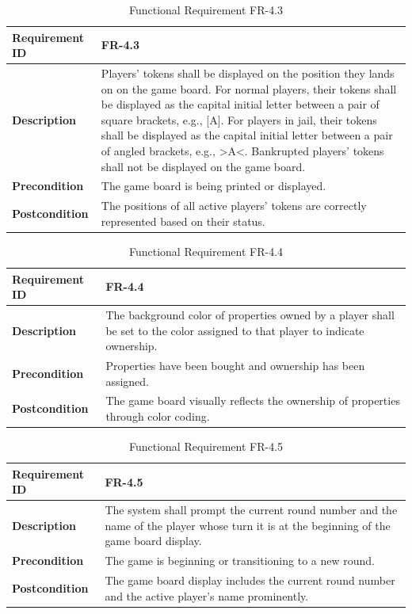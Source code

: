 \documentclass{article}
\begin{document}
\begin{table}[ht]
    \centering
    \caption{Functional Requirement FR-4.3}
    \begin{tabular}{@{}P{3cm}P{12cm}@{}}
        \toprule
        \textbf{Requirement ID} & FR-4.3 \\ \midrule
        \textbf{Description} & Players' tokens shall be displayed on the position they lands on on the game board. For normal players, their tokens shall be displayed as the capital initial letter between a pair of square brackets, e.g., [A]. For players in jail, their tokens shall be displayed as the capital initial letter between a pair of angled brackets, e.g., >A<. Bankrupted players’ tokens shall not be displayed on the game board. \\ \midrule
        \textbf{Precondition} & The game board is being printed or displayed. \\ \midrule
        \textbf{Postcondition} & The positions of all active players' tokens are correctly represented based on their status. \\ \bottomrule
    \end{tabular}
\end{table}

\begin{table}[ht]
    \centering
    \caption{Functional Requirement FR-4.4}
    \begin{tabular}{@{}P{3cm}P{12cm}@{}}
        \toprule
        \textbf{Requirement ID} & FR-4.4 \\ \midrule
        \textbf{Description} & The background color of properties owned by a player shall be set to the color assigned to that player to indicate ownership. \\ \midrule
        \textbf{Precondition} & Properties have been bought and ownership has been assigned. \\ \midrule
        \textbf{Postcondition} & The game board visually reflects the ownership of properties through color coding. \\ \bottomrule
    \end{tabular}
\end{table}

\begin{table}[ht]
    \centering
    \caption{Functional Requirement FR-4.5}
    \begin{tabular}{@{}P{3cm}P{12cm}@{}}
        \toprule
        \textbf{Requirement ID} & FR-4.5 \\ \midrule
        \textbf{Description} & The system shall prompt the current round number and the name of the player whose turn it is at the beginning of the game board display. \\ \midrule
        \textbf{Precondition} & The game is beginning or transitioning to a new round. \\ \midrule
        \textbf{Postcondition} & The game board display includes the current round number and the active player's name prominently. \\ \bottomrule
    \end{tabular}
\end{table}
\end{document}
